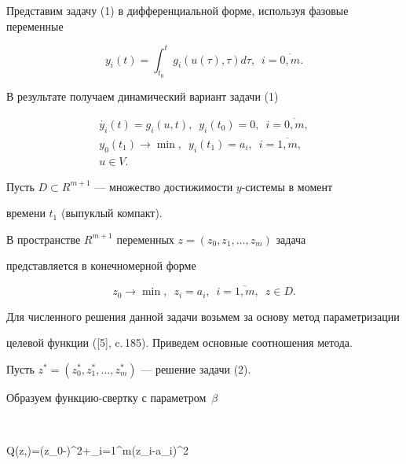 Представим задачу (1) в дифференциальной форме, используя фазовые переменные


$$


y_{i}(t)=\int_{t_{0}}^{t}g_{i}(u(\tau),\tau)d\tau,\ \;i=\overline{0,m}.


$$


В результате получаем динамический вариант задачи (1)


\begin{gather*}


\Dot{y_{i}}(t)=g_{i}(u,t),\ \;y_{i}(t_{0})=0,\ \;i=\overline{0,m}, \\


%


y_{0}(t_{1})\rightarrow\min,


\ \;y_{i}(t_{1})=a_{i},\ \;i=\overline{1,m}, \\


%


u\in V.


\end{gather*}





Пусть $D\subset R^{m+1}$ --- множество достижимости $y$-системы в момент 


времени $t_{1}$ (выпуклый компакт).


В пространстве $R^{m+1}$ переменных $z=(z_{0},z_{1},\dotsc,z_{m})$ задача 


представляется в конечномерной форме 


\begin{equation}


z_{0}\rightarrow\min,\ \;z_{i}=a_{i},


\ \;i=\overline{1,m},\ \;z\in D.


\end{equation}





Для численного решения данной задачи возьмем за основу метод параметризации


целевой функции ([5], c.\,185). Приведем основные соотношения метода.





Пусть $z^{*}=(z_{0}^{*},z_{1}^{*},\dotsc,z_{m}^{*})$ --- решение задачи (2). 


Образуем функцию-свертку с параметром~$\beta$


$$


Q(z,\beta)=(z_{0}-\beta)^{2}+\sum_{i=1}^{m}(z_{i}-a_{i})^{2}


